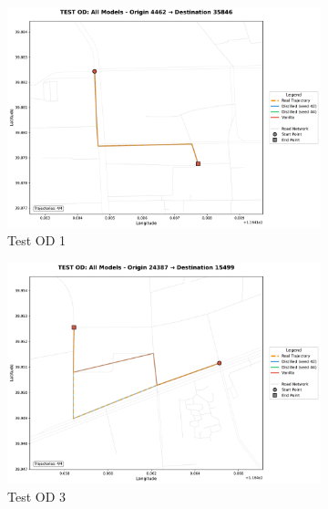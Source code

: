 \begin{figure}[H]
    \centering
    \begin{subfigure}{0.49\linewidth}
        \centering
        \includegraphics[width=\linewidth]{assets/plots/eval/beijing/trajectories/test_od_comparison_1_origin4462_dest35846.pdf}
        \caption{Test OD 1}
    \end{subfigure}
    \begin{subfigure}{0.49\linewidth}
        \centering
        \includegraphics[width=\linewidth]{assets/plots/eval/beijing/trajectories/test_od_comparison_3_origin24387_dest15499.pdf}
        \caption{Test OD 3}
    \end{subfigure}
    \begin{subfigure}{0.49\linewidth}
        \centering

\end{subfigure}
\end{figure}
